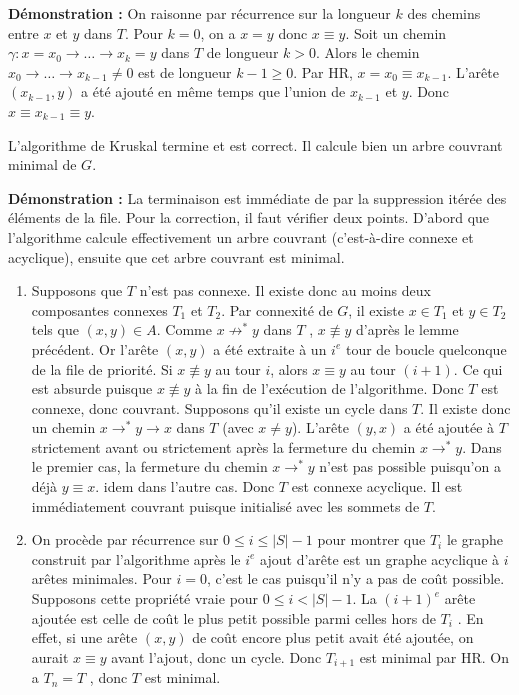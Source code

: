 \documentclass[../../../main.tex]{subfiles}
\begin{document}
\textbf{Démonstration :} On raisonne par récurrence sur la longueur $k$ des chemins entre $x$ et $y$ dans $T$. Pour
$k = 0$, on a $x = y$ donc $x\equiv y$. Soit un chemin $\gamma : x = x_0 \rightarrow \dots \rightarrow x_k = y$ dans $T$ de longueur $k > 0$.
Alors le chemin $x_0\rightarrow \dots \rightarrow x_{k-1} \neq 0$ est de longueur $k-1\geq 0$. Par HR, $x = x_0 \equiv x_{k-1}$. L'arête
$(x_{k-1} , y)$ a été ajouté en même temps que l'union de $x_{k-1}$ et $y$. Donc $x\equiv x_{k-1} \equiv y$.

 L'algorithme de Kruskal termine et
est correct. Il calcule bien un arbre couvrant minimal de $G$.

\textbf{Démonstration :} La terminaison est immédiate de par la suppression itérée des éléments de la file.
Pour la correction, il faut vérifier deux points. D'abord que l'algorithme calcule effectivement un arbre
couvrant (c'est-à-dire connexe et acyclique), ensuite que cet arbre couvrant est minimal.
\begin{enumerate}
	\item Supposons que $T$ n'est pas connexe. Il existe donc au moins deux composantes connexes $T_1$ et $T_2$.
	Par connexité de $G$, il existe $x\in T_1$ et $y\in T_2$ tels que $(x, y)\in A$. Comme $x\not\rightarrow^* y$ dans $T$ , $x\not\equiv y$
d'après le lemme précédent. Or l'arête $(x, y)$ a été extraite à un $i^e$ tour de boucle quelconque de
la file de priorité. Si $x\not\equiv y$ au tour $i$, alors $x\equiv y$ au tour $(i+1)$. Ce qui est absurde puisque
$x\not\equiv y$ à la fin de l'exécution de l'algorithme. Donc $T$ est connexe, donc couvrant. \newline
Supposons qu'il existe un cycle dans $T$. Il existe donc un chemin $x\rightarrow^*y \rightarrow x$ dans $T$ (avec $x\neq y$). L'arête $(y, x)$ a été ajoutée à $T$ strictement avant ou strictement après la fermeture du
chemin $x\rightarrow^*y$. Dans le premier cas, la fermeture du chemin $x\rightarrow^*y$ n'est pas possible puisqu'on
a déjà $y\equiv x$. idem dans l'autre cas. \newline
Donc $T$ est connexe acyclique. Il est immédiatement couvrant puisque initialisé avec les sommets
de $T$.
	\item On procède par récurrence sur $0 \leq i \leq |S| - 1$ pour montrer que $T_i$ le graphe construit par
l'algorithme après le $i^e$ ajout d'arête est un graphe acyclique à $i$ arêtes minimales. Pour $i = 0$, c'est
le cas puisqu'il n'y a pas de coût possible. Supposons cette propriété vraie pour $0\leq i < |S| - 1$.
La $(i + 1)^e$ arête ajoutée est celle de coût le plus petit possible parmi celles hors de $T_i$ . En effet,
si une arête $(x, y)$ de coût encore plus petit avait été ajoutée, on aurait $x\equiv y$ avant l'ajout, donc
un cycle. Donc $T_{i+1}$ est minimal par HR. On a $T_n = T$ , donc $T$ est minimal.
\end{enumerate}
\end{document}
